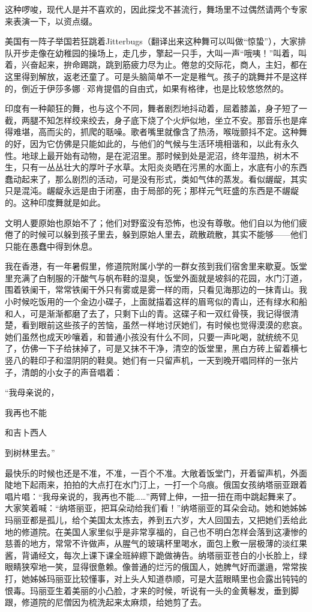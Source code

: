 \par 这种啰唆，现代人是并不喜欢的，因此探戈不甚流行，舞场里不过偶然请两个专家来表演一下，以资点缀。
\par 美国有一阵子举国若狂跳着Jitterbugs（翻译出来这种舞可以叫做“惊蛰”），大家排队开步走像在幼稚园的操场上，走几步，擎起一只手，大叫一声“哦咦！”叫着，叫着，兴奋起来，拚命踢跳，跳到筋疲力尽为止。倦怠的交际花，商人，主妇，都在这里得到解放，返老还童了。可是头脑简单不一定是稚气。孩子的跳舞并不是这样的，倒近于伊莎多娜·邓肯提倡的自由式，如果有格律，也是比较悠悠然的。
\par 印度有一种颠狂的舞，也与这个不同，舞者剧烈地抖动着，屈着膝盖，身子短了一截，两腿不知怎样绞来绞去，身子底下烧了个火炉似地，坐立不安。那音乐也是痒得难堪，高而尖的，抓爬的聒噪。歌者嘴里就像含了热汤，喉咙颤抖不定。这种舞的好，因为它仿佛是只能如此的，与他们的气候与生活环境相谐和，以此有永久性。地球上最开始有动物，是在泥沼里。那时候到处是泥沼，终年湿热，树木不生，只有一丛丛壮大的厚叶子水草。太阳炎炎晒在污黑的水面上，水底有小的东西蠢动起来了，那么剧烈的活动，可是没有形式，类如气体的蒸发。看似龌龊，其实只是混沌。龌龊永远是由于闭塞，由于局部的死；那样元气旺盛的东西是不龌龊的。这种印度舞就是如此。
\par 文明人要原始也原始不了；他们对野蛮没有恐怖，也没有尊敬。他们自以为他们疲倦了的时候可以躲到孩子里去，躲到原始人里去，疏散疏散，其实不能够——他们只能在愚蠢中得到休息。
\par 我在香港，有一年暑假里，修道院附属小学的一群女孩到我们宿舍里来歇夏。饭堂里充满了白制服的汗酸气与帆布鞋的湿臭，饭堂外面就是坡斜的花园，水门汀道，围着铁阑干，常常铁阑干外只有雾或是雾一样的雨，只看见海那边的一抹青山。我小时候吃饭用的一个金边小碟子，上面就描着这样的眉弯似的青山，还有绿水和船和人，可是渐渐都磨了去了，只剩下山的青。这碟子和一双红骨筷，我记得很清楚，看到眼前这些孩子的苦恼，虽然一样地讨厌她们，有时候也觉得漠漠的悲哀。她们虽然也成天吵嚷着，和普通小孩没有什么不同，只要一声叱喝，就统统不见了，仿佛一下子给抹掉了，可是又抹不干净，清空的饭堂里，黑白方砖上留着横七竖八的鞋印子和湿阴阴的鞋臭。她们有一只留声机，一天到晚开唱同样的一张片子，清朗的小女子的声音唱着：
\par “我母亲说的，
\par 我再也不能
\par 和吉卜西人
\par 到树林里去。”
\par 最快乐的时候也还是不准，不准，一百个不准。大敞着饭堂门，开着留声机，外面陡地下起雨来，拍拍的大点打在水门汀上，一打一个乌痕。俄国女孩纳塔丽亚跟着唱片唱：“我母亲说的，我再也不能……”两臂上伸，一扭一扭在雨中跳起舞来了。大家笑着喊：“纳塔丽亚，把耳朵动给我们看！”纳塔丽亚的耳朵会动。她和她姊姊玛丽亚都是孤儿，给个美国太太拣去，养到五六岁，大人回国去，又把她们丢给此地的修道院。在美国人家里似乎是非常享福的，自己也不明白怎样会落到这凄惨的慈善的地方，常常不许做声，从腥气的玻璃杯里喝水，面包上敷一层极薄的淡红果酱，背诵经文，每次上课下课全班綷縩下跪做祷告。纳塔丽亚苍白的小长脸上，绿眼睛狭窄地一笑，显得很惫赖。像普通的烂污的俄国人，她脾气好而邋遢，常常挨打，她姊姊玛丽亚比较懂事，对上头人知道恭顺，可是大蓝眼睛里也会露出钝钝的恨毒。玛丽亚生着美丽的小凸脸，才来的时候，听说有一头的金黄鬈发，垂到脚跟，修道院的尼僧因为梳洗起来太麻烦，给她剪了去。

